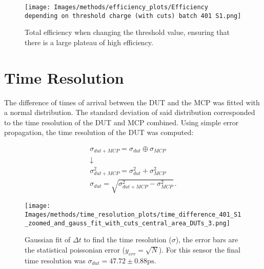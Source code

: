 \begin{figure}[h!tbp]
    \centering
    \texttt{[image: Images/methods/efficiency\_plots/Efficiency depending on threshold charge (with cuts) batch 401 S1.png]}
    \caption{Total efficiency when changing the threshold value, ensuring that there is a large plateau of high efficiency.}
    \label{fig:efficiency_depending_threshold}
\end{figure}


\section{Time Resolution}\label{sec:methods_time_resolution}

The difference of times of arrival between the DUT and the MCP was fitted with a normal distribution. The standard deviation of said distribution corresponded to the time resolution of the DUT and MCP combined. Using simple error propagation, the time resolution of the DUT was computed: 

\begin{equation*}
    \begin{gathered}
    \sigma_{dut+MCP} = \sigma_{dut} \oplus \sigma_{MCP} \\
    \downarrow \\
    \sigma_{dut+MCP}^2 = \sigma_{dut}^2 + \sigma_{MCP}^2 \\
    \sigma_{dut} = \sqrt{\sigma_{dut+MCP}^2-\sigma_{MCP}^2}  \, .
    \end{gathered}
\end{equation*}


\begin{figure}[h!tbp]
    \centering
    \texttt{[image: Images/methods/time\_resolution\_plots/time\_difference\_401\_S1\_zoomed\_and\_gauss\_fit\_with\_cuts\_central\_area\_DUTs\_3.png]}
    \captionsetup{width=\captionwidth}
    \caption{Gaussian fit of \(\Delta t\) to find the time resolution (\(\sigma\)), the error bars are the statistical poissonian error (\(y_{err}=\sqrt{N}\)). For this sensor the final time resolution was \(\sigma_{dut} = 47.72\pm0.88\si{\ps} \).}
    \label{fig:time_resolution_plot}
\end{figure}



